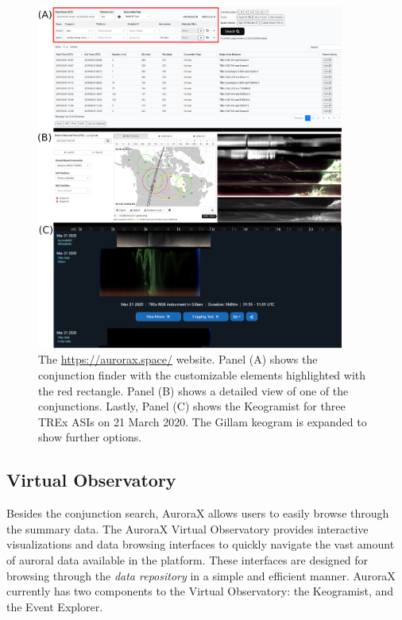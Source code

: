 \documentclass[utf8]{FrontiersinHarvard} %
\begin{document}
\begin{figure}
    \centering
    \includegraphics[width=0.9\textwidth]{figures/fig1.jpg}
    \caption{The \url{https://aurorax.space/} website. Panel (A) shows the conjunction finder with the customizable elements highlighted with the red rectangle. Panel (B) shows a detailed view of one of the conjunctions. Lastly, Panel (C) shows the Keogramist for three TREx ASIs on 21 March 2020. The Gillam keogram is expanded to show further options. }
    \label{fig1}
\end{figure}

\subsection{Virtual Observatory}

Besides the conjunction search, AuroraX allows users to easily browse through the summary data. The AuroraX Virtual Observatory provides interactive visualizations and data browsing interfaces to quickly navigate the vast amount of auroral data available in the platform. These interfaces are designed for browsing through the \textit{data repository} in a simple and efficient manner. AuroraX currently has two components to the Virtual Observatory: the Keogramist, and the Event Explorer.
\end{document}
